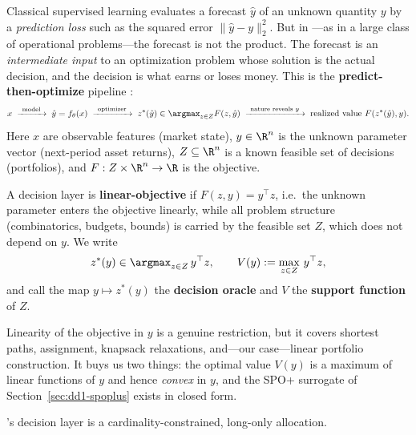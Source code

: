 Classical supervised learning evaluates a forecast $\hat{y}$ of an unknown
quantity $y$ by a \emph{prediction loss} such as the squared error
$\|\hat{y}-y\|_2^2$. But in \nm{}---as in a large class of operational
problems---the forecast is not the product. The forecast is an
\emph{intermediate input} to an optimization problem whose solution is the
actual decision, and the decision is what earns or loses money. This is the
\textbf{predict-then-optimize} pipeline \cite{elmachtoub2022smart,
mandi2020smart, mandi2024decision}:
\begin{equation}
\label{eq:dd1-pipeline}
x \;\xrightarrow{\ \text{model}\ }\; \hat{y} = f_\theta(x)
\;\xrightarrow{\ \text{optimizer}\ }\; z^*(\hat{y}) \in \argmax_{z \in Z}
F(z, \hat{y})
\;\xrightarrow{\ \text{nature reveals } y\ }\; \text{realized value } F(z^*(\hat{y}), y).
\end{equation}
Here $x$ are observable features (market state), $y \in \R^n$ is the unknown
parameter vector (next-period asset returns), $Z \subseteq \R^n$ is a known
feasible set of decisions (portfolios), and $F : Z \times \R^n \to \R$ is the
objective.

\begin{definition}
\label{def:dd1-linear-layer}
A decision layer is \textbf{linear-objective} if $F(z, y) = y^\top z$, i.e.\
the unknown parameter enters the objective linearly, while all problem
structure (combinatorics, budgets, bounds) is carried by the feasible set $Z$,
which does not depend on $y$. We write
\begin{equation}
\label{eq:dd1-oracle-def}
z^*(y) \in \argmax_{z \in Z} \, y^\top z, \qquad
V(y) := \max_{z \in Z} \, y^\top z ,
\end{equation}
and call the map $y \mapsto z^*(y)$ the \textbf{decision oracle} and $V$ the
\textbf{support function} of $Z$.
\end{definition}

\begin{remark}
Linearity of the objective in $y$ is a genuine restriction, but it covers
shortest paths, assignment, knapsack relaxations, and---our case---linear
portfolio construction. It buys us two things: the optimal value $V(y)$ is a
maximum of linear functions of $y$ and hence \emph{convex} in $y$, and the SPO+
surrogate of Section~\ref{sec:dd1-spoplus} exists in closed form.
\end{remark}

\nm{}'s decision layer is a cardinality-constrained, long-only allocation.

